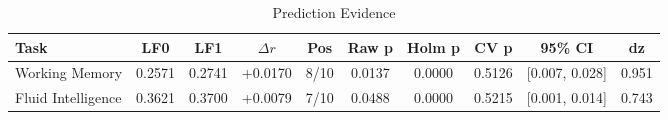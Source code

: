 \begin{table}[ht]
\centering
\caption{Prediction Evidence}
\begin{tabular}{lccccccccc}
\toprule
Task & LF0 & LF1 & $\Delta r$ & Pos & Raw p & Holm p & CV p & 95\% CI & dz \\
\midrule
Working Memory & 0.2571 & 0.2741 & +0.0170 & 8/10 & 0.0137 & 0.0000 & 0.5126 & [0.007, 0.028] & 0.951 \\
Fluid Intelligence & 0.3621 & 0.3700 & +0.0079 & 7/10 & 0.0488 & 0.0000 & 0.5215 & [0.001, 0.014] & 0.743 \\
\bottomrule
\end{tabular}
\end{table}
